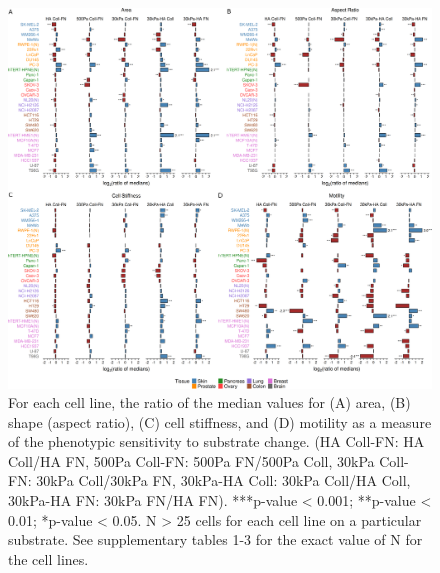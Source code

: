 \documentclass[11pt,letterpaper,english,oneside]{article} %
\begin{document}
\begin{figure}[H]
    \hspace*{-2cm}
    \centering
    \includegraphics[scale=0.13]{../Figures/Supplementary_Figure2/supplementary_figure2.png}
    \caption{For each cell line, the ratio of the median values for (A) area, (B) shape (aspect ratio), (C) cell stiffness, and (D) motility as a measure of the phenotypic sensitivity to substrate change. 
    (HA Coll-FN: HA Coll/HA FN, 500Pa Coll-FN: 500Pa FN/500Pa Coll, 30kPa Coll-FN: 30kPa Coll/30kPa FN, 30kPa-HA Coll: 30kPa Coll/HA Coll, 30kPa-HA FN: 30kPa FN/HA FN). 
    ***p-value < 0.001; **p-value < 0.01; *p-value < 0.05. N > 25 cells for each cell line on a particular substrate. See supplementary tables 1-3 for the exact value of N for the cell lines.}
    \label{fig:fig2}
\end{figure}
\end{document}
